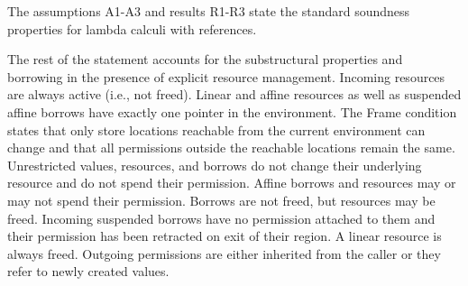 The assumptions A1-A3 and results R1-R3 state the standard soundness properties
for lambda calculi with references.

The rest of the statement accounts for the substructural properties and
borrowing in the presence of explicit resource management.
%
%
%
Incoming resources are always active (i.e., not freed).
Linear and affine resources as well as suspended affine borrows have
exactly one pointer in the environment.
%
The Frame condition states that only store locations reachable from
the current environment can change and that all permissions outside
the reachable locations remain the same.
%
Unrestricted values, resources, and borrows do not change their
underlying resource and do not spend their permission.
%
Affine borrows and resources may or may not spend their
permission. Borrows are not freed, but resources may be freed.
%
Incoming suspended borrows have no permission attached to them and
their permission has been retracted on exit of their region.
%
A linear resource is always freed.
%
Outgoing permissions are either inherited from the caller or they
refer to newly created values.

\lstDeleteShortInline@


